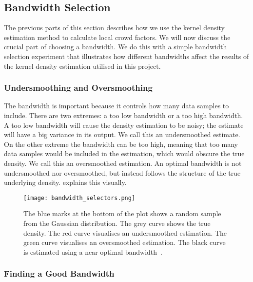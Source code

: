 \subsection{Bandwidth Selection}

The previous parts of this section describes how we use the kernel density estimation method to calculate local crowd factors. We will now discuss the crucial part of choosing a bandwidth. We do this with a simple bandwidth selection experiment that illustrates how different bandwidths affect the results of the kernel density estimation utilised in this project.

\subsubsection{Undersmoothing and Oversmoothing}

The bandwidth is important because it controls how many data samples to include. There are two extremes: a too low bandwidth or a too high bandwidth. A too low bandwidth will cause the density estimation to be noisy; the estimate will have a big variance in its output. We call this an undersmoothed estimate. On the other extreme the bandwidth can be too high, meaning that too many data samples would be included in the estimation, which would obscure the true density. We call this an oversmoothed estimation. An optimal bandwidth is not undersmoothed nor oversmoothed, but instead follows the structure of the true underlying density.  explains this visually.


\begin{figure}[htbp]
\centering
    \texttt{[image: bandwidth\_selectors.png]}
    \caption[Undersmoothing/Oversmoothing explanation]{The blue marks at the bottom of the plot shows a random sample from the Gaussian distribution. The grey curve shows the true density. The red curve visualises an undersmoothed estimation. The green curve visualises an oversmoothed estimation. The black curve is estimated using a near optimal bandwidth~\cite{wiki:kernel_density_estimation}.}
    \label{fig:bandwidth_selectors}
\end{figure}

\subsubsection{Finding a Good Bandwidth}

